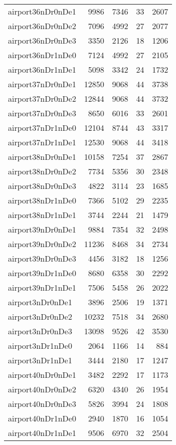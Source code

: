 \begin{longtable}{lrrrr}
airport36nDr0nDe1 & 9986 & 7346 & 33 & 2607 \\
airport36nDr0nDe2 & 7096 & 4992 & 27 & 2077 \\
airport36nDr0nDe3 & 3350 & 2126 & 18 & 1206 \\
airport36nDr1nDe0 & 7124 & 4992 & 27 & 2105 \\
airport36nDr1nDe1 & 5098 & 3342 & 24 & 1732 \\
airport37nDr0nDe1 & 12850 & 9068 & 44 & 3738 \\
airport37nDr0nDe2 & 12844 & 9068 & 44 & 3732 \\
airport37nDr0nDe3 & 8650 & 6016 & 33 & 2601 \\
airport37nDr1nDe0 & 12104 & 8744 & 43 & 3317 \\
airport37nDr1nDe1 & 12530 & 9068 & 44 & 3418 \\
airport38nDr0nDe1 & 10158 & 7254 & 37 & 2867 \\
airport38nDr0nDe2 & 7734 & 5356 & 30 & 2348 \\
airport38nDr0nDe3 & 4822 & 3114 & 23 & 1685 \\
airport38nDr1nDe0 & 7366 & 5102 & 29 & 2235 \\
airport38nDr1nDe1 & 3744 & 2244 & 21 & 1479 \\
airport39nDr0nDe1 & 9884 & 7354 & 32 & 2498 \\
airport39nDr0nDe2 & 11236 & 8468 & 34 & 2734 \\
airport39nDr0nDe3 & 4456 & 3182 & 18 & 1256 \\
airport39nDr1nDe0 & 8680 & 6358 & 30 & 2292 \\
airport39nDr1nDe1 & 7506 & 5458 & 26 & 2022 \\
airport3nDr0nDe1 & 3896 & 2506 & 19 & 1371 \\
airport3nDr0nDe2 & 10232 & 7518 & 34 & 2680 \\
airport3nDr0nDe3 & 13098 & 9526 & 42 & 3530 \\
airport3nDr1nDe0 & 2064 & 1166 & 14 & 884 \\
airport3nDr1nDe1 & 3444 & 2180 & 17 & 1247 \\
airport40nDr0nDe1 & 3482 & 2292 & 17 & 1173 \\
airport40nDr0nDe2 & 6320 & 4340 & 26 & 1954 \\
airport40nDr0nDe3 & 5826 & 3994 & 24 & 1808 \\
airport40nDr1nDe0 & 2940 & 1870 & 16 & 1054 \\
airport40nDr1nDe1 & 9506 & 6970 & 32 & 2504 \\

\end{longtable}
